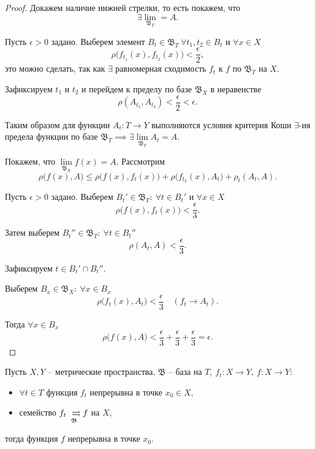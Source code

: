 \begin{proof}
    Докажем наличие нижней стрелки, то есть покажем, что
    \[
        \exists \underset{\mathfrak{B}_T}{\lim} = A.
    \]

    Пусть $ \epsilon > 0 $ задано. Выберем элемент $ B_t \in \mathfrak{B}_T \ \forall t_1,t_2 \in B_t $ и $ \forall x \in X $
    \[
        \rho\big(f_{t_1}(x),f_{t_2}(x)\big) < \frac{\epsilon}{2},
    \]
    это можно сделать, так как $ \exists $ равномерная сходимость $ f_t $ к $ f $ по $ \mathfrak{B}_T $ на $ X $.

    Зафиксируем $ t_1 $ и $ t_2 $ и перейдем к пределу по базе $ \mathfrak{B}_X $ в неравенстве
    \[
        \rho(A_{t_1},A_{t_2}) < \frac{\epsilon}{2} < \epsilon.
    \]

    Таким образом для функции $ A_t: T \rightarrow Y $ выполняются условия критерия Коши $ \exists $-ия предела функции по базе $ \mathfrak{B}_T \implies \exists \underset{\mathfrak{B}_T}{\lim}A_t = A $.

    Покажем, что $ \underset{\mathfrak{B}_X}{\lim}f(x) = A $. Рассмотрим
    \[
        \rho\big(f(x),A\big) \leqslant \rho\big(f(x),f_t(x)\big) + \rho\big(f_{t_2}(x),A_t\big) + \rho_t(A_t,A).
    \]

    Пусть $ \epsilon > 0 $ задано. Выберем $ B_t' \in \mathfrak{B}_T: \ \forall t \in B_t' $ и $ \forall x \in X $
    \[
        \rho\big(f(x),f_t(x)\big) < \frac{\epsilon}{3}.
    \]

    Затем выберем $ B_t'' \in \mathfrak{B}_T: \ \forall t \in B_t'' $
    \[
        \rho(A_t,A) < \frac{\epsilon}{3}.
    \]

    Зафиксируем $ t \in B_t' \cap B_t''$.

    Выберем $ B_x \in \mathfrak{B}_X: \ \forall x \in B_x $
    \[
        \rho\big(f_t(x),A_t\big) < \frac{\epsilon}{3} \quad (f_t \rightarrow A_t).
    \]

    Тогда $ \forall x \in B_x $
    \[
        \rho\big(f(x),A\big) < \frac{\epsilon}{3} + \frac{\epsilon}{3} + \frac{\epsilon}{3} = \epsilon.
    \]
\end{proof}

\begin{theorem}
    Пусть $ X,Y $ -- метрические пространства, $ \mathfrak{B} $ -- база на $ T, \ f_t: X \rightarrow Y, \ f: X \rightarrow Y $:
    \begin{itemize}
        \item $ \forall t \in T $ функция $ f_t $ непрерывна в точке $ x_0 \in X $,
        \item семейство $ f_t \xrightrightarrows[\mathfrak{B}]{} f $ на $ X $,
    \end{itemize}
    тогда функция $ f $ непрерывна в точке $ x_0 $.
\end{theorem}

